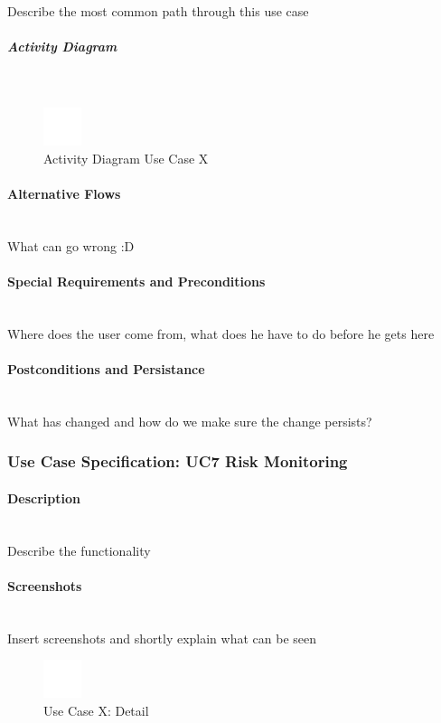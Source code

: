 Describe the most common path through this use case

\subparagraph{Activity Diagram}\mbox{}\\
\begin{figure}[h]
	\centering
	\includegraphics[width=0.1\textwidth]{Content/Domain/placeholder.png}
	\caption{Activity Diagram Use Case X}
	\label{fig:label66}
\end{figure}

\paragraph*{Alternative Flows}\mbox{}\\
What can go wrong :D

\paragraph*{Special Requirements and Preconditions}\mbox{}\\
Where does the user come from, what does he have to do before he gets here

\paragraph*{Postconditions and Persistance}\mbox{}\\
What has changed and how do we make sure the change persists?

\newpage
\subsubsection{Use Case Specification: \ac{UC}7 Risk Monitoring}
\label{sec:domainBbh}

\paragraph*{Description}\mbox{}\\
Describe the functionality

\paragraph*{Screenshots}\mbox{}\\
Insert screenshots and shortly explain what can be seen
\begin{figure}[h] 
	\centering
	\includegraphics[width=0.1\textwidth]{Content/Domain/placeholder.png}
	\caption{Use Case X: Detail}
	\label{fig:label7}
\end{figure}

